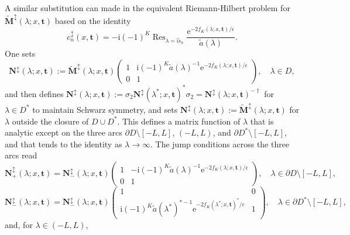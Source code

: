 \documentclass[12pt]{amsart}
\numberwithin{equation}{section}
\newcommand{\ee}{\mathrm{e}}
\newcommand{\ii}{\mathrm{i}}
\newcommand{\SP}{\lambda}
\begin{document}
\begin{rem}
A similar substitution can made in the equivalent Riemann-Hilbert problem for $\widetilde{\mathbf{M}}^\updownarrow(\SP;x,\mathbf{t})$ based on the identity
\begin{equation}
c_n^\updownarrow(x,\mathbf{t})=-\ii (-1)^K\mathop{\mathrm{Res}}_{\SP=\ii\widetilde{s}_n}\frac{\ee^{-2f_K(\SP;x,\mathbf{t})/\epsilon}}{\widetilde{a}(\SP)}.
\end{equation}
One sets 
\begin{equation}
\mathbf{N}^\updownarrow(\SP;x,\mathbf{t}):=\widetilde{\mathbf{M}}^\updownarrow(\SP;x,\mathbf{t})\begin{pmatrix}1 & \ii (-1)^K\widetilde{a}(\SP)^{-1}\ee^{-2f_K(\SP;x,\mathbf{t})/\epsilon}\\0 & 1\end{pmatrix},\quad \SP\in D,
\end{equation}
and then defines $\mathbf{N}^\updownarrow(\SP;x,\mathbf{t}):=\sigma_2\mathbf{N}^\updownarrow(\SP^*;x,\mathbf{t})^*\sigma_2=\mathbf{N}^\updownarrow(\SP;x,\mathbf{t})^{-\dagger}$ for $\SP\in D^*$ to maintain Schwarz symmetry, and sets $\mathbf{N}^\updownarrow(\SP;x,\mathbf{t}):=\widetilde{\mathbf{M}}^\updownarrow(\SP;x,\mathbf{t})$ for $\SP$ outside the closure of $D\cup D^*$.  This defines a matrix function of $\SP$ that is analytic except on the three arcs $\partial D\setminus [-L,L]$, $(-L,L)$, and $\partial D^*\setminus [-L,L]$, and that tends to the identity as $\SP\to\infty$.  The jump conditions across the three arcs read
\begin{equation}
\mathbf{N}^\updownarrow_+(\SP;x,\mathbf{t})=\mathbf{N}^\updownarrow_-(\SP;x,\mathbf{t})\begin{pmatrix}1&-\ii(-1)^K\widetilde{a}(\SP)^{-1}\ee^{-2f_K(\SP;x,\mathbf{t})/\epsilon}\\0 & 1\end{pmatrix},\quad\SP\in\partial D\setminus[-L,L],
\end{equation}
\begin{equation}
\mathbf{N}^\updownarrow_-(\SP;x,\mathbf{t})=\mathbf{N}^\updownarrow_-(\SP;x,\mathbf{t})\begin{pmatrix}1 & 0\\\ii (-1)^K\widetilde{a}(\SP^*)^{*-1}\ee^{-2f_K(\SP^*;x,\mathbf{t})^*/\epsilon} & 1\end{pmatrix},\quad\SP\in\partial D^*\setminus[-L,L],
\end{equation}
and, for $\SP\in (-L,L)$,
\begin{multline}

\end{multline}
\end{rem}
\end{document}
